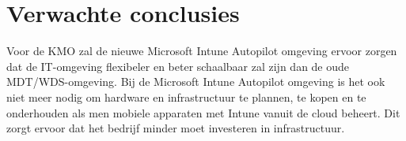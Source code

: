 \section{Verwachte conclusies}
\label{sec:verwachte_conclusies}

Voor de KMO zal de nieuwe Microsoft Intune Autopilot omgeving ervoor zorgen dat de IT-omgeving flexibeler en beter schaalbaar zal zijn dan de oude MDT/WDS-omgeving. Bij de Microsoft Intune Autopilot omgeving is het ook niet meer nodig om hardware en infrastructuur te plannen, te kopen en te onderhouden als men mobiele apparaten met Intune vanuit de cloud beheert. Dit zorgt ervoor dat het bedrijf minder moet investeren in infrastructuur.



